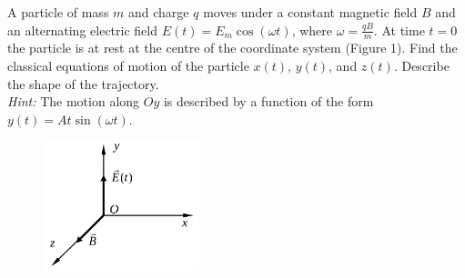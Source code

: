 \documentclass[../TST.tex]{subfiles}
\begin{document}
\begin{pproblem}
	A particle of mass $m$ and charge $q$ moves under a constant magnetic field $B$ and an alternating electric field $E(t)=E_m\cos{(\omega t)}$, where $\omega = \frac{qB}{m}$. At time $t=0$ the particle is at rest at the centre of the coordinate system (Figure 1). Find the classical equations of motion of the particle $x(t)$, $y(t)$, and $z(t)$. Describe the shape of the trajectory. \\[5pt]
\textit{Hint:} The motion along $Oy$ is described by a function of the form $y(t)=At\sin{(\omega t)}$.\\
\begin{figure}[H]
\centering
    \includegraphics[width=0.4\textwidth]{fig/2012_s3.png}
  \caption{}
  \label{fig1}
  \end{figure}

\end{pproblem}
\end{document}

